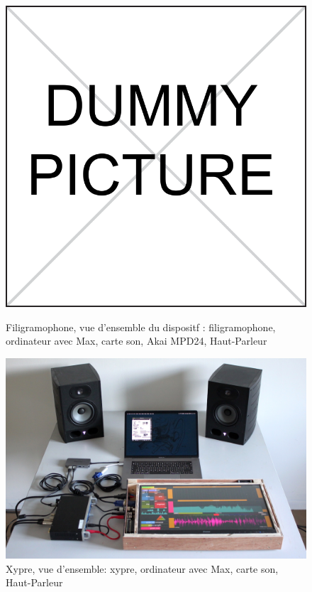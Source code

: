 \begin{figure}[!htbp]
	\captionsetup{format=plain}%
	\centering
	\begin{minipage}[t]{0.48\textwidth}
		\includegraphics[width=\linewidth]{gfx/dummy.pdf}
		\caption{Filigramophone, vue d'ensemble du dispositf : filigramophone, ordinateur avec Max, carte son, Akai MPD24, Haut-Parleur}
		\label{fig:interface:filigramophone}
	\end{minipage}
	\hspace{.02\linewidth}
	\begin{minipage}[t]{0.48\textwidth}
	    \includegraphics[width=\linewidth]{gfx/05_interfaces/Xypre_Overview_144dpi.jpg}
		\caption{Xypre, vue d'ensemble: xypre, ordinateur avec Max, carte son, Haut-Parleur}
		\label{fig:interface:xypre}
	\end{minipage}
\end{figure}

